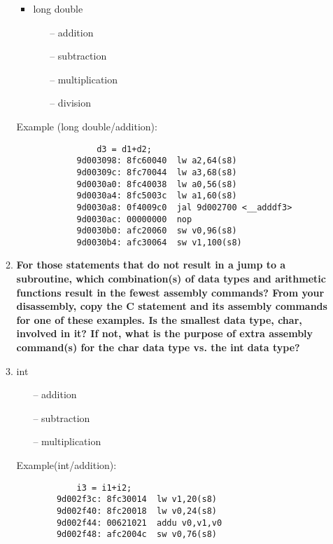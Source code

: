 \documentclass{article}
\begin{document}
\begin{enumerate}[label=\textbf{\arabic*})]
\begin{enumerate}[label=\textbf{\alph*}.]
\begin{itemize}
            \item long double
            \begin{itemize}
                \item[--] addition
                \item[--] subtraction
                \item[--] multiplication
                \item[--] division
            \end{itemize}
        \end{itemize}
        \vspace{1em}
        Example (long double/addition): \\
        \begin{lstlisting}
                d3 = d1+d2;
            9d003098: 8fc60040  lw a2,64(s8)
            9d00309c: 8fc70044  lw a3,68(s8)
            9d0030a0: 8fc40038  lw a0,56(s8)
            9d0030a4: 8fc5003c  lw a1,60(s8)
            9d0030a8: 0f4009c0  jal 9d002700 <__adddf3>
            9d0030ac: 00000000  nop
            9d0030b0: afc20060  sw v0,96(s8)
            9d0030b4: afc30064  sw v1,100(s8)
        \end{lstlisting}

        \item \textbf{For those statements that do not result in a jump to a subroutine, which
        combination(s) of data types and arithmetic functions result in the fewest assembly
        commands? From your disassembly, copy the C statement and its assembly
        commands for one of these examples. Is the smallest data type, char, involved in it?
        If not, what is the purpose of extra assembly command(s) for the char data type vs.
        the int data type?} \\

        \item int
        \begin{itemize}
            \item[--] addition
            \item[--] subtraction
            \item[--] multiplication
        \end{itemize}

        Example(int/addition): \\
        
        \begin{lstlisting}
            i3 = i1+i2;
        9d002f3c: 8fc30014  lw v1,20(s8)
        9d002f40: 8fc20018  lw v0,24(s8)
        9d002f44: 00621021  addu v0,v1,v0
        9d002f48: afc2004c  sw v0,76(s8)
        \end{lstlisting}


\end{enumerate}
\end{enumerate}
\end{document}
